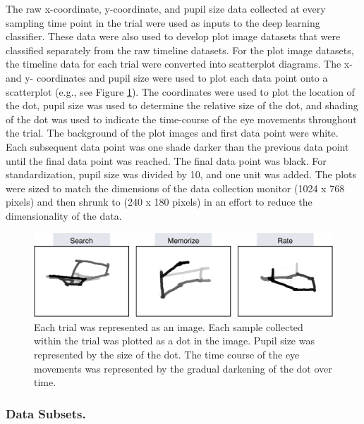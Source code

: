 \documentclass[
  english,
  man, donotrepeattitle,floatsintext]{apa6}
\begin{document}
The raw x-coordinate, y-coordinate, and pupil size data collected at every sampling time point in the trial were used as inputs to the deep learning classifier. These data were also used to develop plot image datasets that were classified separately from the raw timeline datasets. For the plot image datasets, the timeline data for each trial were converted into scatterplot diagrams. The x- and y- coordinates and pupil size were used to plot each data point onto a scatterplot (e.g., see Figure \ref{fig:ave-condition}). The coordinates were used to plot the location of the dot, pupil size was used to determine the relative size of the dot, and shading of the dot was used to indicate the time-course of the eye movements throughout the trial. The background of the plot images and first data point were white. Each subsequent data point was one shade darker than the previous data point until the final data point was reached. The final data point was black. For standardization, pupil size was divided by 10, and one unit was added. The plots were sized to match the dimensions of the data collection monitor (1024 x 768 pixels) and then shrunk to (240 x 180 pixels) in an effort to reduce the dimensionality of the data.

\begin{figure}
\centering
\includegraphics{figures/cond_imgs.pdf}
\caption{\label{fig:ave-condition}Each trial was represented as an image. Each sample collected within the trial was plotted as a dot in the image. Pupil size was represented by the size of the dot. The time course of the eye movements was represented by the gradual darkening of the dot over time.}
\end{figure}

\subsubsection{Data Subsets.}
\end{document}
